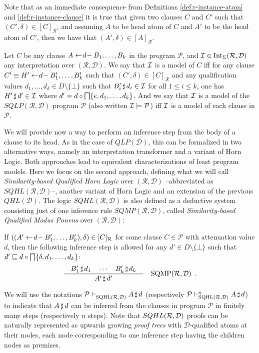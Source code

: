 \documentclass{sigplanconf}
\newcommand{\qdom}{\mathcal{D}} \newcommand{\dqdom}{D \setminus \{\bot\}} \newcommand{\bqdom}{(D \setminus \{\bot\}) \uplus \{?\}}
\newcommand{\simrel}{\mathcal{R}}
\newcommand{\qlp}[1]{QLP({#1})} \newcommand{\slp}[2]{SLP({#1,#2})} \newcommand{\sqlp}[2]{SQLP({#1,#2})} \newcommand{\bqlp}[1]{BQLP({#1})} \newcommand{\clp}[1]{CLP({#1})}
\newcommand{\Prog}{\mathcal{P}} \newcommand{\UProg}{\mathcal{P_U}}
\theoremstyle{definition}
\theoremstyle{plain}
\begin{document}
Note that as an immediate consequence from Definitions \ref{def:r-instance-atom} and \ref{def:r-instance-clause} it is true that given two clauses $C$ and $C'$ such that $(C',\delta) \in [C]_\simrel$, and assuming $A$ to be head atom of $C$ and $A'$ to be the head atom of $C'$, then we have that $(A',\delta) \in [A]_\simrel$.

Let $C$ be any clause $A \gets\!d\!- B_1, \ldots, B_k$ in the program $\Prog$, and $\I \in \intrd$ any interpretation over $(\simrel,\qdom)$. We say that $\mathcal{I}$ is a model of $C$ iff for any clause $C' \equiv H' \gets\!d\!- B'_1, \ldots, B'_k$ such that $(C',\delta) \in [C]_\simrel$ and any qualification values $d_1, \ldots, d_k \in \dqdom$ such that $B'_i\,\sharp\,d_i \in \mathcal{I}$ for all $1 \le i \le k$, one has $H'\,\sharp\,d' \in \mathcal{I}$ where $d' = d \circ \bigsqcap \{e, d_1, \ldots, d_k\}$. And we say that $\mathcal{I}$ is a model of the $\sqlp{\simrel}{\qdom}$ program $\Prog$ (also written $\I \models \Prog$) iff $\mathcal{I}$ is a model of each clause in $\Prog$.



We will provide now a way to perform an inference step from the body of a clause to its head. As in the case of  $\qlp{\qdom}$, this can be formalized in two alternative ways, namely an interpretation transformer and a variant of Horn Logic. Both approaches lead to equivalent characterizations of least program models. Here we focus on the second approach, defining what we will call \emph{Similarity-based Qualified Horn Logic} over $(\simrel,\qdom)$ --abbreviated as $SQHL(\simrel,\qdom)$--, another variant of Horn Logic and an extension of the previous $QHL(\qdom)$. The logic $SQHL(\simrel,\qdom)$ is also defined as a deductive system consisting just of one inference rule $SQMP(\simrel,\qdom)$, called \emph{Similarity-based Qualified Modus Ponens} over $(\simrel,\qdom)$:

If $((A' \qgets{d} B'_1, \ldots, B'_k), \delta) \in [C]_\simrel$ for some clause $C \in \Prog$ with attenuation value $d$, then the following inference step is allowed for any $d' \in \dqdom$ such that $d' \sqsubseteq d \circ \bigsqcap \{\delta, d_1, \ldots, d_k\}$:
\[
    \frac
    {\quad \at{B'_{1}}{d_{1}} \quad \cdots \quad \at{B'_{k}}{d_{k}} \quad}
    {\at{A'}{d'}} \quad \mbox{SQMP}(\simrel,\qdom) \enspace .
\]

We will use the notations $\Prog \sqhlrd \at{A}{d}$ (respectively $\Prog \sqhlrdn{n} \at{A}{d}$) to indicate that $A\,\sharp\,d$ can be inferred from the clauses in program $\Prog$ in finitely many steps (respectively $n$ steps). Note that $\sqhl{\simrel}{\qdom}$ proofs can be naturally represented as upwards growing \emph{proof trees} with $\qdom$-qualified atoms at their nodes, each node corresponding to one inference step having the children nodes as premises.
\end{document}
